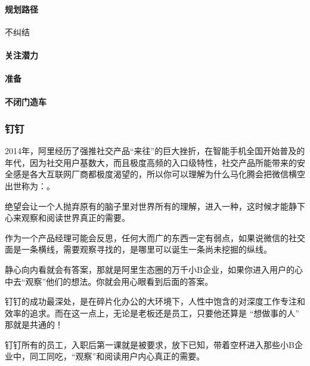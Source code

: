 \documentclass[letterpaper,10pt,english]{sphinxmanual}
\begin{document}
\paragraph{规划路径}
\label{\detokenize{chapter_experience/diudiu:id5}}
不纠结



\paragraph{关注潜力}
\label{\detokenize{chapter_experience/diudiu:id6}}

\paragraph{准备}
\label{\detokenize{chapter_experience/diudiu:id7}}

\paragraph{不闭门造车}
\label{\detokenize{chapter_experience/diudiu:id8}}

\subsubsection{钉钉}
\label{\detokenize{chapter_experience/dingding:id1}}\label{\detokenize{chapter_experience/dingding::doc}}
2014年，阿里经历了强推社交产品“来往”的巨大挫折，在智能手机全国开始普及的年代，因为社交用户基数大，而且极度高频的入口级特性，社交产品所能带来的安全感是各大互联网厂商都极度渴望的，所以你可以理解为什么马化腾会把微信横空出世称为：。

绝望会让一个人抛弃原有的脑子里对世界所有的理解，进入一种，这时候才能静下心来观察和阅读世界真正的需要。

作为一个产品经理可能会反思，任何大而广的东西一定有弱点，如果说微信的社交面是一条横线，需要观察寻找的，是哪里可以诞生一条尚未挖掘的纵线。

静心向内看就会有答案，那就是阿里生态圈的万千小B企业，如果你进入用户的心中去“观察”他们的想法。你就会用心眼看到后面的答案。

钉钉的成功最深处，是在碎片化办公的大环境下，人性中饱含的对深度工作专注和效率的追求。而在这一点上，无论是老板还是员工，只要他还算是
“想做事的人” 那就是共通的！

钉钉所有的员工，入职后第一课就是被要求，放下已知，带着空杯进入那些小B企业中，同工同吃，“观察”和阅读用户内心真正的需要。
\end{document}
